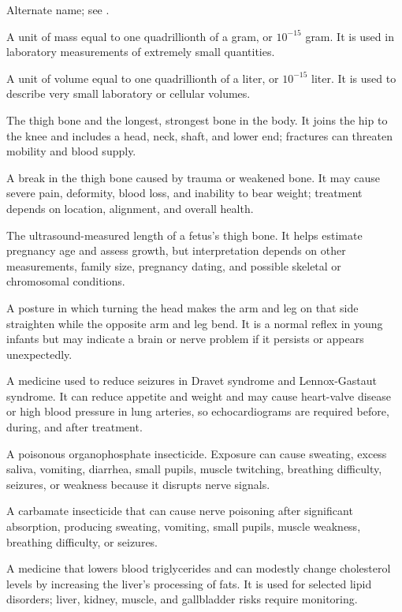  Alternate name; see .

 A unit of mass equal to one quadrillionth of a gram, or $10^{-15}$ gram. It is used in laboratory measurements of extremely small quantities.

 A unit of volume equal to one quadrillionth of a liter, or $10^{-15}$ liter. It is used to describe very small laboratory or cellular volumes.

 The thigh bone and the longest, strongest bone in the body. It joins the hip to the knee and includes a head, neck, shaft, and lower end; fractures can threaten mobility and blood supply.

 A break in the thigh bone caused by trauma or weakened bone. It may cause severe pain, deformity, blood loss, and inability to bear weight; treatment depends on location, alignment, and overall health.

 The ultrasound-measured length of a fetus’s thigh bone. It helps estimate pregnancy age and assess growth, but interpretation depends on other measurements, family size, pregnancy dating, and possible skeletal or chromosomal conditions.

 A posture in which turning the head makes the arm and leg on that side straighten while the opposite arm and leg bend. It is a normal reflex in young infants but may indicate a brain or nerve problem if it persists or appears unexpectedly.

 A medicine used to reduce seizures in Dravet syndrome and Lennox-Gastaut syndrome. It can reduce appetite and weight and may cause heart-valve disease or high blood pressure in lung arteries, so echocardiograms are required before, during, and after treatment.

 A poisonous organophosphate insecticide. Exposure can cause sweating, excess saliva, vomiting, diarrhea, small pupils, muscle twitching, breathing difficulty, seizures, or weakness because it disrupts nerve signals.

 A carbamate insecticide that can cause nerve poisoning after significant absorption, producing sweating, vomiting, small pupils, muscle weakness, breathing difficulty, or seizures.

 A medicine that lowers blood triglycerides and can modestly change cholesterol levels by increasing the liver's processing of fats. It is used for selected lipid disorders; liver, kidney, muscle, and gallbladder risks require monitoring.

